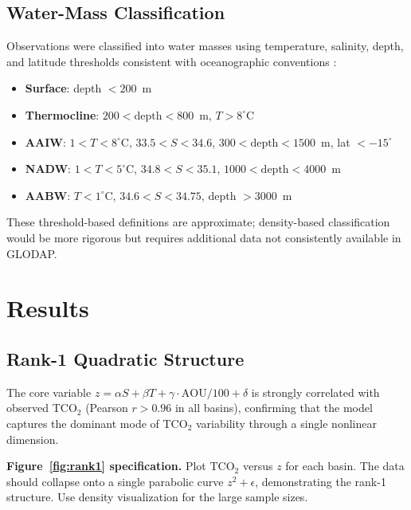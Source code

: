\documentclass[12pt,a4paper]{article}
\begin{document}
\subsection{Water-Mass Classification}

Observations were classified into water masses using temperature, salinity, depth, and latitude thresholds consistent with oceanographic conventions \citep{Tomczak2002}:
\begin{itemize}[nosep]
    \item \textbf{Surface}: depth $< 200$~m
    \item \textbf{Thermocline}: $200 < \text{depth} < 800$~m, $T > 8^\circ$C
    \item \textbf{AAIW}: $1 < T < 8^\circ$C, $33.5 < S < 34.6$, $300 < \text{depth} < 1500$~m, lat $< -15^\circ$
    \item \textbf{NADW}: $1 < T < 5^\circ$C, $34.8 < S < 35.1$, $1000 < \text{depth} < 4000$~m
    \item \textbf{AABW}: $T < 1^\circ$C, $34.6 < S < 34.75$, depth $> 3000$~m
\end{itemize}
These threshold-based definitions are approximate; density-based classification would be more rigorous but requires additional data not consistently available in GLODAP.

\section{Results}
\label{sec:results}

\subsection{Rank-1 Quadratic Structure}

The core variable $z = \alpha S + \beta T + \gamma \cdot \text{AOU}/100 + \delta$ is strongly correlated with observed TCO$_2$ (Pearson $r > 0.96$ in all basins), confirming that the model captures the dominant mode of TCO$_2$ variability through a single nonlinear dimension.

\textbf{Figure~\ref{fig:rank1} specification.} Plot TCO$_2$ versus $z$ for each basin. The data should collapse onto a single parabolic curve $z^2 + \epsilon$, demonstrating the rank-1 structure. Use density visualization for the large sample sizes.
\end{document}
